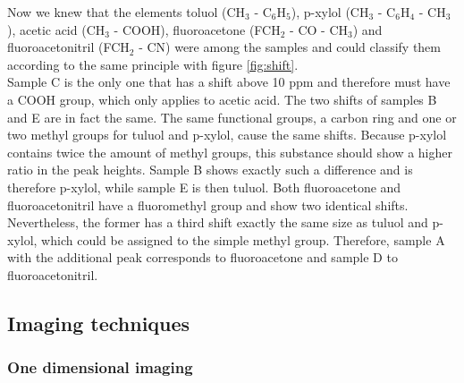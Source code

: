 Now we knew that the elements toluol (CH$_3$ - C$_6$H$_5$), p-xylol (CH$_3$ - C$_6$H$_4$ - CH$_3$), acetic acid (CH$_3$ - COOH), fluoroacetone (FCH$_2$ - CO - CH$_3$) and fluoroacetonitril (FCH$_2$ - CN) were among the samples and could classify them according to the same principle with figure \ref{fig:shift}.\\
Sample C is the only one that has a shift above 10 ppm and therefore must have a COOH group, which only applies to acetic acid.
The two shifts of samples B and E are in fact the same.
The same functional groups, a carbon ring and one or two methyl groups for tuluol and p-xylol, cause the same shifts.
Because p-xylol contains twice the amount of methyl groups, this substance should show a higher ratio in the peak heights.
Sample B shows exactly such a difference and is therefore p-xylol, while sample E is then tuluol.
Both fluoroacetone and fluoroacetonitril have a fluoromethyl group and show two identical shifts.
Nevertheless, the former has a third shift exactly the same size as tuluol and p-xylol, which could be assigned to the simple methyl group.
Therefore, sample A with the additional peak corresponds to fluoroacetone and sample D to fluoroacetonitril.



\subsection{Imaging techniques}
\subsubsection{One dimensional imaging}

